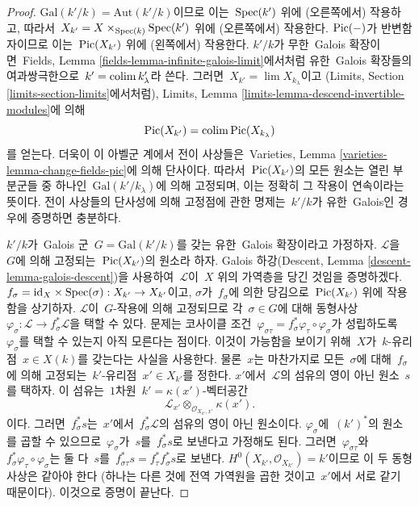 \begin{proof}
$\text{Gal}(k'/k) = \text{Aut}(k'/k)$이므로 이는\  $\mathop{\mathrm{Spec}}(k')$ 위에
(오른쪽에서) 작용하고, 따라서\ 
$X_{k'} = X \times_{\mathop{\mathrm{Spec}}(k)} \mathop{\mathrm{Spec}}(k')$ 위에 (오른쪽에서) 작용한다.
$\mathop{\mathrm{Pic}}\nolimits(-)$가 반변함자이므로 이는\  $\mathop{\mathrm{Pic}}\nolimits(X_{k'})$ 위에 (왼쪽에서) 작용한다.
$k'/k$가 무한\  Galois 확장이면\  Fields, Lemma
\ref{fields-lemma-infinite-galois-limit}에서처럼 유한\  Galois 확장들의
여과쌍극한으로\  $k' = \mathop{\mathrm{colim}}\nolimits k'_\lambda$라 쓴다. 그러면\ 
$X_{k'} = \lim X_{k_\lambda}$이고
(Limits, Section \ref{limits-section-limits}에서처럼), Limits, Lemma
\ref{limits-lemma-descend-invertible-modules}에 의해
$$
\mathop{\mathrm{Pic}}\nolimits(X_{k'}) = \mathop{\mathrm{colim}}\nolimits \mathop{\mathrm{Pic}}\nolimits(X_{k_\lambda})
$$
를 얻는다. 더욱이 이 아벨군 계에서 전이 사상들은\  Varieties, Lemma
\ref{varieties-lemma-change-fields-pic}에 의해 단사이다. 따라서\ 
$\mathop{\mathrm{Pic}}\nolimits(X_{k'})$의 모든 원소는 열린 부분군들 중 하나인\ 
$\text{Gal}(k'/k_\lambda)$에 의해 고정되며, 이는 정확히 그 작용이
연속이라는 뜻이다. 전이 사상들의 단사성에 의해 고정점에 관한 명제는\ 
$k'/k$가 유한\  Galois인 경우에 증명하면 충분하다.

\medskip\noindent
$k'/k$가\  Galois 군\  $G = \text{Gal}(k'/k)$를 갖는 유한\  Galois 확장이라고
가정하자. $\mathcal{L}$을\  $G$에 의해 고정되는\ 
$\mathop{\mathrm{Pic}}\nolimits(X_{k'})$의 원소라 하자. Galois 하강(Descent, Lemma
\ref{descent-lemma-galois-descent})을 사용하여\  $\mathcal{L}$이\  $X$ 위의
가역층을 당긴 것임을 증명하겠다.
$f_\sigma = \text{id}_X \times \mathop{\mathrm{Spec}}(\sigma) : X_{k'} \to X_{k'}$이고,
$\sigma$가\  $f_\sigma$에 의한 당김으로\  $\mathop{\mathrm{Pic}}\nolimits(X_{k'})$ 위에 작용함을
상기하자. $\mathcal{L}$이\  $G$-작용에 의해 고정되므로 각\ 
$\sigma \in G$에 대해 동형사상\ 
$\varphi_\sigma : \mathcal{L} \to f_\sigma^*\mathcal{L}$을 택할 수 있다.
문제는 코사이클 조건\ 
$\varphi_{\sigma\tau} = f_\sigma^*\varphi_\tau \circ \varphi_\sigma$가
성립하도록\  $\varphi_\sigma$를 택할 수 있는지 아직 모른다는 점이다.
이것이 가능함을 보이기 위해\  $X$가\  $k$-유리점\  $x \in X(k)$를 갖는다는
사실을 사용한다. 물론\  $x$는 마찬가지로 모든\  $\sigma$에 대해\ 
$f_\sigma$에 의해 고정되는\  $k'$-유리점\  $x' \in X_{k'}$를 정한다.
$x'$에서\  $\mathcal{L}$의 섬유의 영이 아닌 원소\  $s$를 택하자. 이 섬유는\ 
$1$차원\  $k' = \kappa(x')$-벡터공간
$$
\mathcal{L}_{x'} \otimes_{\mathcal{O}_{X_{k'}, x'}} \kappa(x').
$$
이다. 그러면\  $f_\sigma^*s$는\  $x'$에서\  $f_\sigma^*\mathcal{L}$의 섬유의
영이 아닌 원소이다. $\varphi_\sigma$에\  $(k')^*$의 원소를 곱할 수 있으므로\ 
$\varphi_\sigma$가\  $s$를\  $f_\sigma^*s$로 보낸다고 가정해도 된다.
그러면\  $\varphi_{\sigma\tau}$와\ 
$f_\sigma^*\varphi_\tau \circ \varphi_\sigma$는 둘 다\  $s$를\ 
$f_{\sigma\tau}^*s = f_\tau^*f_\sigma^*s$로 보낸다.
$H^0(X_{k'}, \mathcal{O}_{X_{k'}}) = k'$이므로 이 두 동형사상은 같아야 한다
(하나는 다른 것에 전역 가역원을 곱한 것이고\  $x'$에서 서로 같기 때문이다).
이것으로 증명이 끝난다.
\end{proof}

